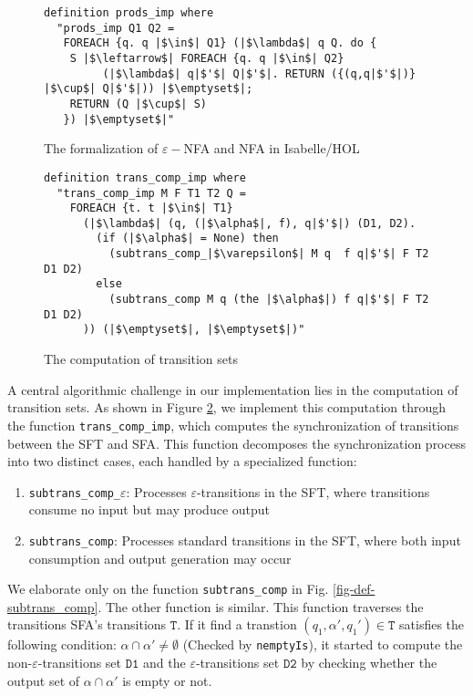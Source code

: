 \documentclass[a4paper,UKenglish,cleveref, autoref, anonymous, thm-restate]{lipics-v2021}
\begin{document}
\begin{figure}[hbt!]
	\begin{lstlisting}
definition prods_imp where
  "prods_imp Q1 Q2 =
   FOREACH {q. q |$\in$| Q1} (|$\lambda$| q Q. do {
    S |$\leftarrow$| FOREACH {q. q |$\in$| Q2}
         (|$\lambda$| q|$'$| Q|$'$|. RETURN ({(q,q|$'$|)} |$\cup$| Q|$'$|)) |$\emptyset$|;
    RETURN (Q |$\cup$| S)
   }) |$\emptyset$|"
\end{lstlisting}
\caption{The formalization of $\varepsilon-$NFA and NFA in Isabelle/HOL}
\label{fig-def-prods_imp}
\end{figure}



\begin{figure}[hbt!]
	\begin{lstlisting}
definition trans_comp_imp where
  "trans_comp_imp M F T1 T2 Q =
    FOREACH {t. t |$\in$| T1}
      (|$\lambda$| (q, (|$\alpha$|, f), q|$'$|) (D1, D2). 
        (if (|$\alpha$| = None) then 
          (subtrans_comp_|$\varepsilon$| M q  f q|$'$| F T2 D1 D2)
        else 
          (subtrans_comp M q (the |$\alpha$|) f q|$'$| F T2 D1 D2)
      )) (|$\emptyset$|, |$\emptyset$|)"
\end{lstlisting}
\caption{The computation of transition sets}
\label{fig-def-prods-imp}
\end{figure}

A central algorithmic challenge in our implementation lies in the computation of transition sets. As shown in Figure \ref{fig-def-prods-imp}, we implement this computation through the function \texttt{trans\_comp\_imp}, which computes the synchronization of transitions between the SFT and SFA. This function decomposes the synchronization process into two distinct cases, each handled by a specialized function:

\begin{enumerate}
  \item \texttt{subtrans\_comp\_$\varepsilon$}: Processes $\varepsilon$-transitions in the SFT, where transitions consume no input but may produce output
  \item \texttt{subtrans\_comp}: Processes standard transitions in the SFT, where both input consumption and output generation may occur
\end{enumerate}


We elaborate only on the function \texttt{subtrans\_comp} in Fig. \ref{fig-def-subtrans_comp}. The other function is similar. 
This function traverses the transitions SFA's transitions $\texttt{T}$. If it find a transtion $(q_1, \alpha', q_1')\in \texttt{T}$ satisfies the following condition:
$\alpha \cap \alpha' \neq \emptyset$ (Checked by \texttt{nemptyIs}),
it started to compute the non-$\varepsilon$-transitions set $\texttt{D1}$ and the $\varepsilon$-transitions set $\texttt{D2}$ by checking whether the output set of $\alpha \cap \alpha'$ is empty or not.
\end{document}
